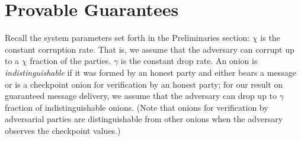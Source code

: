 \documentclass[runningheads,a4paper]{llncs}
\begin{document}
\iffalse
\begin{figure}[ht!]
\begin{pchstack} [center, boxed]
\pseudocode[linenumbering]{
c_1, \dots, c_{\ell_1}, j \gets 0 \\
\textbf{upon receiving $O$} \\
\pcind (\mathsf{Role}, k, y, O', P') \gets \proconion(\sk(P_i), O) \\
\pcind \pcif \mathsf{Role} = \mathsf{Recipient} \\
\pcind \pcind \pcreturn O' \\
\pcind \pcif k < j \\
\pcind \pcind \pcif \mathsf{Role} = \mathsf{Gatekeeper} \\
\pcind \pcind \pcind \textbf{send $O'$ to $P'$} \\
\pcind \pcind \pcelse \pccomment{$\mathsf{Role} = \mathsf{Mixer}$} \\
\pcind \pcind \pcind O'' \gets \bruiseonion(\sk(P_i), O) \\
\pcind \pcind \pcind \textbf{send $O''$ to $P'$} \\
\pcind \pcelse \pccomment{$k \ge j$} \\
\pcind \pcind \textbf{place $(O', P')$ in outbox} \\
\pcind \pcind \pcif (y \neq \bot) \land (\exists k \textbf{ s.t.~$y \in \mathcal{Y}_k$)} \\
\pcind \pcind \pcind \mathcal{Y}_k \gets \mathcal{Y}_k\setminus\{y\} \\
\pcind \pcind \pcind c_k \gets c_k+1 \\
\textbf{upon } c_j \ge \tau|\mathcal{Y}_j| \\
\pcind j \gets j+1 \\
\pcind \textbf{send peeled $j^{th}$ layer onions out in random order}
}
\end{pchstack}
\caption{\footnotesize{Pseudocode for processing onions}}
\label{fig:proconions}
\end{figure}
\fi

\section{Provable Guarantees} \label{sec:proofs}

\newcommand{\corruption}{\chi}
\newcommand{\drop}{\gamma}
Recall the system parameters set forth in the Preliminaries section: 
$\corruption$ is the constant corruption rate. That is, we assume that the adversary can corrupt up to a $\chi$ fraction of the parties. 
$\drop$ is the constant drop rate. 
An onion is \emph{indistinguishable} if it was formed by an honest party and either bears a message or is a checkpoint onion for verification by an honest party; 
for our result on guaranteed message delivery, we assume that the adversary can drop up to $\drop$ fraction of indistinguishable onions. 
(Note that onions for verification by adversarial parties are distinguishable from other onions when the adversary observes the checkpoint values.) 
\end{document}
